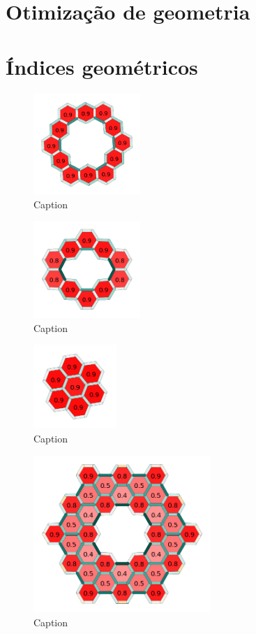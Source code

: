 \section{Otimização de geometria}

\section{Índices geométricos}

\begin{figure}[htb!]
    \centering
    \includegraphics[width=0.36\textwidth]{images/kekulene.png}
    \caption{Caption}
    \label{fig:my_label}
\end{figure}

\begin{figure}[htb!]
    \centering
    \includegraphics[width=0.36\textwidth]{images/Icosaene.png}
    \caption{Caption}
    \label{fig:my_label}
\end{figure}

\begin{figure}[htb!]
    \centering
    \includegraphics[width=0.28\textwidth]{images/coronene.png}
    \caption{Caption}
    \label{fig:my_label}
\end{figure}

\begin{figure}[htb!]
    \centering
    \includegraphics[width=0.6\textwidth]{images/output.png}
    \caption{Caption}
    \label{fig:my_label}
\end{figure}